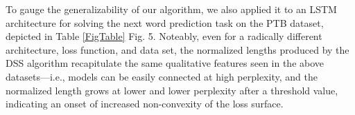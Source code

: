  To gauge the generalizability of our algorithm, we also applied it to an LSTM architecture for solving the next word prediction task on the PTB dataset, depicted in Table \ref{FigTable} Fig. 5.  Noteably, even for a radically different architecture, loss function, and data set, the normalized lengths produced by the DSS algorithm recapitulate the same qualitative features seen in the above datasets---i.e., models can be easily connected at high perplexity, and the normalized length grows at lower and lower perplexity after a threshold value, indicating an onset of increased non-convexity of the loss surface.



